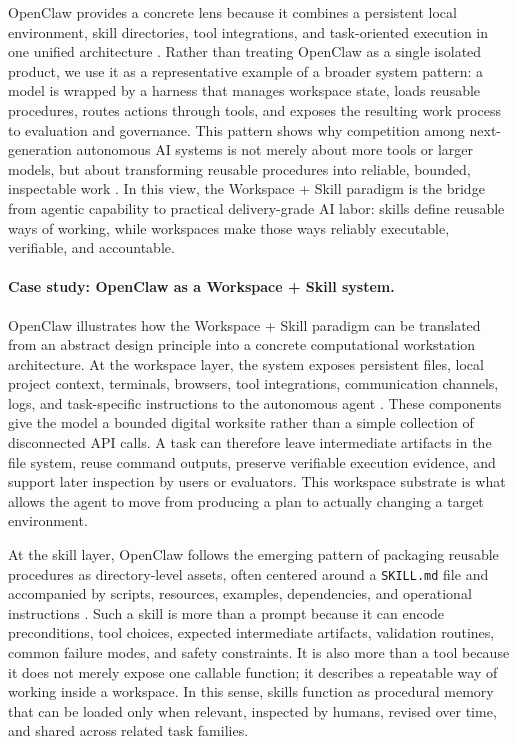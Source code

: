 OpenClaw provides a concrete lens because it combines a persistent local environment, skill directories, tool integrations, and task-oriented execution in one unified architecture \cite{openclaw2026repo,openclaw2026skillsdocs,openclaw2026skillsrepo}. Rather than treating OpenClaw as a single isolated product, we use it as a representative example of a broader system pattern: a model is wrapped by a harness that manages workspace state, loads reusable procedures, routes actions through tools, and exposes the resulting work process to evaluation and governance. This pattern shows why competition among next-generation autonomous AI systems is not merely about more tools or larger models, but about transforming reusable procedures into reliable, bounded, inspectable work \cite{reliability2026computeruse,rosset2026verifiers,bhardwaj2026skillfortify}. In this view, the Workspace + Skill paradigm is the bridge from agentic capability to practical delivery-grade AI labor: skills define reusable ways of working, while workspaces make those ways reliably executable, verifiable, and accountable.

\paragraph{Case study: OpenClaw as a Workspace + Skill system.}
OpenClaw illustrates how the Workspace + Skill paradigm can be translated from an abstract design principle into a concrete computational workstation architecture. At the workspace layer, the system exposes persistent files, local project context, terminals, browsers, tool integrations, communication channels, logs, and task-specific instructions to the autonomous agent \cite{openclaw2026repo}. These components give the model a bounded digital worksite rather than a simple collection of disconnected API calls. A task can therefore leave intermediate artifacts in the file system, reuse command outputs, preserve verifiable execution evidence, and support later inspection by users or evaluators. This workspace substrate is what allows the agent to move from producing a plan to actually changing a target environment.

At the skill layer, OpenClaw follows the emerging pattern of packaging reusable procedures as directory-level assets, often centered around a \texttt{SKILL.md} file and accompanied by scripts, resources, examples, dependencies, and operational instructions \cite{openclaw2026skillsdocs,openclaw2026skillsrepo,voltagent2026awesomeopenclawskills}.
Such a skill is more than a prompt because it can encode preconditions, tool choices, expected intermediate artifacts, validation routines, common failure modes, and safety constraints.
It is also more than a tool because it does not merely expose one callable function; it describes a repeatable way of working inside a workspace.
In this sense, skills function as procedural memory that can be loaded only when relevant, inspected by humans, revised over time, and shared across related task families.

